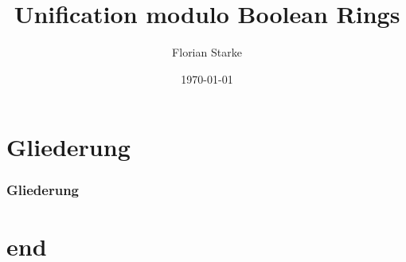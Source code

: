 \documentclass{beamer}
\title{Unification modulo Boolean Rings}
\author{Florian	Starke}
\date{\today}
\begin{document}
\maketitle
\addtocounter{framenumber}{-1}


\section*{Gliederung}
\begin{frame}
\frametitle{Gliederung}
\tableofcontents 
\end{frame}


\section*{end}
\end{document}

